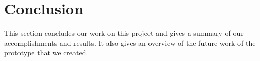 \section{Conclusion}\label{Conclusion}
    This section concludes our work on this project and gives a summary of our accomplishments and results. It also gives an overview of the future work of the prototype that we created.
    
    

    
